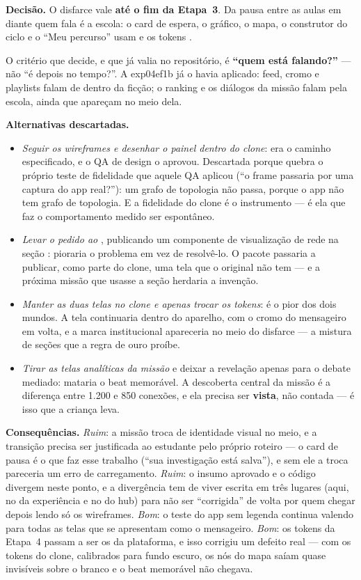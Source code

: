 \textbf{Decisão.} O disfarce vale \textbf{até o fim da Etapa~3}. Da pausa entre
as aulas em diante quem fala é a escola: o card de espera, o gráfico, o mapa, o
construtor do ciclo e o \enquote{Meu percurso} usam  e os tokens
.

O critério que decide, e que já valia no repositório, é
\textbf{\enquote{quem está falando?}} --- não \enquote{é depois no tempo?}. A
exp04ef1b já o havia aplicado: feed, cromo e playlists falam de dentro da ficção; o
ranking e os diálogos da missão falam pela escola, ainda que apareçam no meio
dela.

\textbf{Alternativas descartadas.}
\begin{itemize}
  \item \emph{Seguir os wireframes e desenhar o painel dentro do clone}: era o
    caminho especificado, e o QA de design o aprovou. Descartada porque quebra o
    próprio teste de fidelidade que aquele QA aplicou (\enquote{o frame passaria
    por uma captura do app real?}): um grafo de topologia não passa, porque o
    app não tem grafo de topologia. E a fidelidade do clone é o instrumento ---
    é ela que faz o comportamento medido ser espontâneo.
  \item \emph{Levar o pedido ao }, publicando um
    componente de visualização de rede na seção : pioraria o
    problema em vez de resolvê-lo. O pacote passaria a publicar, como parte do
    clone, uma tela que o original não tem --- e a próxima missão que usasse a
    seção herdaria a invenção.
  \item \emph{Manter as duas telas no clone e apenas trocar os tokens}: é o pior
    dos dois mundos. A tela continuaria dentro do aparelho, com o cromo do
    mensageiro em volta, e a marca institucional apareceria no meio do disfarce
    --- a mistura de seções que a regra de ouro proíbe.
  \item \emph{Tirar as telas analíticas da missão} e deixar a revelação apenas
    para o debate mediado: mataria o beat memorável. A descoberta central da
    missão é a diferença entre 1.200 e 850 conexões, e ela precisa ser
    \textbf{vista}, não contada --- é isso que a criança leva.
\end{itemize}

\textbf{Consequências.} \emph{Ruim}: a missão troca de identidade visual no
meio, e a transição precisa ser justificada ao estudante pelo próprio roteiro
--- o card de pausa é o que faz esse trabalho (\enquote{sua investigação está
salva}), e sem ele a troca pareceria um erro de carregamento. \emph{Ruim}: o
insumo aprovado e o código divergem neste ponto, e a divergência tem de viver
escrita em três lugares (aqui, no  da experiência e no
 do hub) para não ser \enquote{corrigida} de volta por quem
chegar depois lendo só os wireframes. \emph{Bom}: o teste do app sem legenda
continua valendo para todas as telas que se apresentam como o mensageiro.
\emph{Bom}: os tokens da Etapa~4 passam a ser os da plataforma, e isso corrigiu
um defeito real --- com os tokens do clone, calibrados para fundo escuro, os nós
do mapa saíam quase invisíveis sobre o branco e o beat memorável não chegava.

